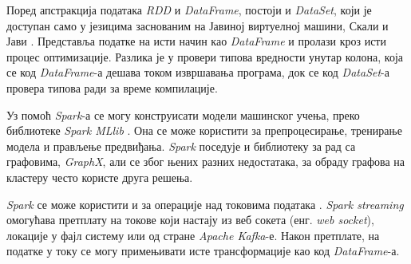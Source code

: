 \documentclass[12pt,oneside]{memoir}
\begin{document}
Поред апстракција података \textit{RDD} и \textit{DataFrame}, постоји и \textit{DataSet}, који је доступан само у језицима заснованим на Јавиној виртуелној машини, Скали и Јави \cite{spark_guide}. Представља податке на исти начин као \textit{DataFrame} и пролази кроз исти процес оптимизације. Разлика је у провери типова вредности унутар колона, која се код \textit{DataFrame}-а дешава током извршавања програма, док се код \textit{DataSet}-а провера типова ради за време компилације.

Уз помоћ \textit{Spark}-а се могу конструисати модели машинског учења, преко библиотеке \textit{Spark MLlib} \cite{spark_guide}. Она се може користити за препроцесирање, тренирање модела и прављење предвиђања. \textit{Spark} поседује и библиотеку за рад са графовима, \textit{GraphX}, али се због њених разних недостатака, за обраду графова на кластеру често користе друга решења.

\textit{Spark} се може користити и за операције над токовима података \cite{spark_streaming}. \textit{Spark streaming} омогућава претплату на токове који настају из веб сокета (енг. \textit{web socket}), локације у фајл систему или од стране \textit{Apache Kafka}-е. Након претплате, на податке у току се могу примењивати исте трансформације као код \textit{DataFrame}-а.

\end{document}
